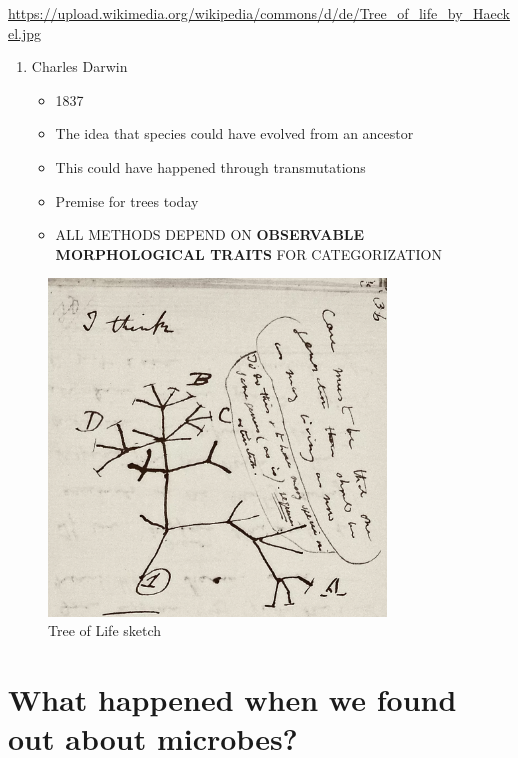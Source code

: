 \documentclass[
]{book}
\providecommand{\tightlist}{%
  \setlength{\itemsep}{0pt}\setlength{\parskip}{0pt}}
\begin{document}
\url{https://upload.wikimedia.org/wikipedia/commons/d/de/Tree_of_life_by_Haeckel.jpg}

\begin{enumerate}
\def\labelenumi{\arabic{enumi}.}
\setcounter{enumi}{3}
\tightlist
\item
  Charles Darwin

  \begin{itemize}
  \tightlist
  \item
    1837
  \item
    The idea that species could have evolved from an ancestor
  \item
    This could have happened through transmutations
  \item
    Premise for trees today
  \item
    ALL METHODS DEPEND ON \textbf{OBSERVABLE MORPHOLOGICAL TRAITS} FOR CATEGORIZATION
  \end{itemize}
\end{enumerate}

\begin{figure}
\centering
\includegraphics[width=0.8\textwidth,height=\textheight]{./Figures/Darwin.png}
\caption{Tree of Life sketch}
\end{figure}

\hypertarget{what-happened-when-we-found-out-about-microbes}{%
\section{What happened when we found out about microbes?}\label{what-happened-when-we-found-out-about-microbes}}
\end{document}
